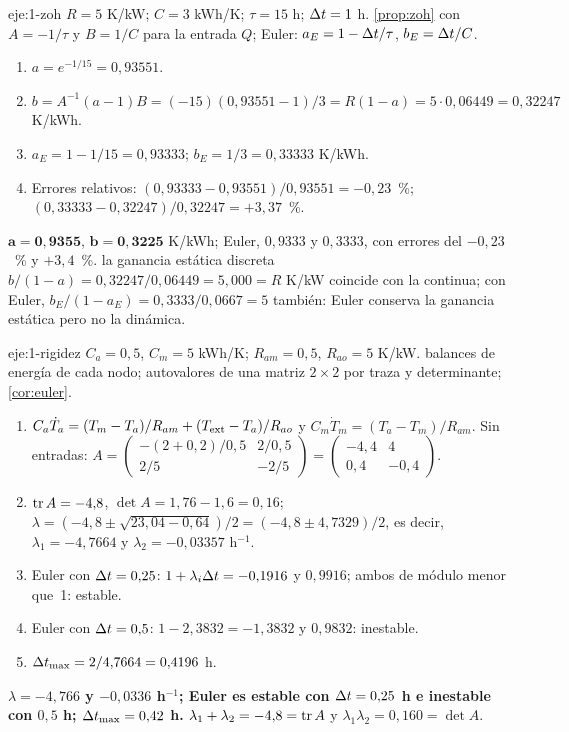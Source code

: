 \begin{solucion}{eje:1-zoh}
\datos $R=5$ K/kW; $C=3$ kWh/K; $\tau=15$ h; $\Delta t=1$ h.
\planteamiento \cref{prop:zoh} con $A=-1/\tau$ y $B=1/C$ para la entrada $Q$; Euler: $a_E=1-\Delta t/\tau$, $b_E=\Delta t/C$.
\pasos
\begin{enumerate}[label=\arabic*.]
  \item $a=e^{-1/15}=0{,}93551$.
  \item $b=A^{-1}(a-1)B=(-15)(0{,}93551-1)/3=R(1-a)=5\cdot0{,}06449=0{,}32247$ K/kWh.
  \item $a_E=1-1/15=0{,}93333$; $b_E=1/3=0{,}33333$ K/kWh.
  \item Errores relativos: $(0{,}93333-0{,}93551)/0{,}93551=-0{,}23$~\%; $(0{,}33333-0{,}32247)/0{,}32247=+3{,}37$~\%.
\end{enumerate}
\resultado $\mathbf{a=0{,}9355}$, $\mathbf{b=0{,}3225}$ K/kWh; Euler, $0{,}9333$ y $0{,}3333$, con errores del $-0{,}23$~\% y $+3{,}4$~\%.
\comprobacion la ganancia estática discreta $b/(1-a)=0{,}32247/0{,}06449=5{,}000=R$ K/kW coincide con la continua; con Euler, $b_E/(1-a_E)=0{,}3333/0{,}0667=5$ también: Euler conserva la ganancia estática pero no la dinámica.
\end{solucion}

\begin{solucion}{eje:1-rigidez}
\datos $C_a=0{,}5$, $C_m=5$ kWh/K; $R_{am}=0{,}5$, $R_{ao}=5$ K/kW.
\planteamiento balances de energía de cada nodo; autovalores de una matriz $2\times2$ por traza y determinante; \cref{cor:euler}.
\pasos
\begin{enumerate}[label=\arabic*.]
  \item $C_a\dot T_a=(T_m-T_a)/R_{am}+(T_{\mathrm{ext}}-T_a)/R_{ao}$ y $C_m\dot T_m=(T_a-T_m)/R_{am}$. Sin entradas:
  $A=\begin{pmatrix}-(2+0{,}2)/0{,}5&2/0{,}5\\2/5&-2/5\end{pmatrix}=\begin{pmatrix}-4{,}4&4\\0{,}4&-0{,}4\end{pmatrix}$.
  \item $\operatorname{tr} A=-4{,}8$, $\det A=1{,}76-1{,}6=0{,}16$; $\lambda=(-4{,}8\pm\sqrt{23{,}04-0{,}64})/2=(-4{,}8\pm4{,}7329)/2$, es decir, $\lambda_1=-4{,}7664$ y $\lambda_2=-0{,}03357$ h$^{-1}$.
  \item Euler con $\Delta t=0{,}25$: $1+\lambda_i\Delta t=-0{,}1916$ y $0{,}9916$; ambos de módulo menor que~1: estable.
  \item Euler con $\Delta t=0{,}5$: $1-2{,}3832=-1{,}3832$ y $0{,}9832$: inestable.
  \item $\Delta t_{\max}=2/4{,}7664=0{,}4196$ h.
\end{enumerate}
\resultado \textbf{$\lambda=-4{,}766$ y $-0{,}0336$ h$^{-1}$; Euler es estable con $\Delta t=0{,}25$ h e inestable con $0{,}5$ h; $\Delta t_{\max}=0{,}42$ h.}
\comprobacion $\lambda_1+\lambda_2=-4{,}8=\operatorname{tr} A$ y $\lambda_1\lambda_2=0{,}160=\det A$.
\end{solucion}

